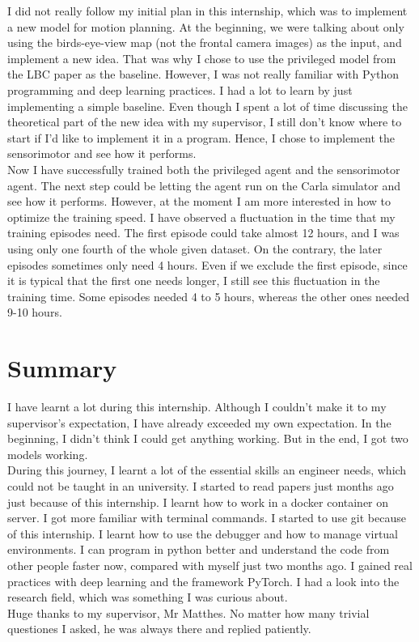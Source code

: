 \documentclass[inputenc=utf8]{ldvarticle}
\begin{document}
\noindent I did not really follow my initial plan in this internship, which was to implement a new model for motion planning. At the beginning, we were talking about only using the birds-eye-view map (not the frontal camera images) as the input, and implement a new idea. That was why I chose to use the privileged model from the LBC paper as the baseline. However, I was not really familiar with Python programming and deep learning practices. I had a lot to learn by just implementing a simple baseline. Even though I spent a lot of time discussing the theoretical part of the new idea with my supervisor, I still don’t know where to start if I’d like to implement it in a program. Hence, I chose to implement the sensorimotor and see how it performs.
\\

\noindent Now I have successfully trained both the privileged agent and the sensorimotor agent. The next step could be letting the agent run on the Carla simulator and see how it performs. However, at the moment I am more interested in how to optimize the training speed. I have observed a fluctuation in the time that my training episodes need. The first episode could take almost 12 hours, and I was using only one fourth of the whole given dataset. On the contrary, the later episodes sometimes only need 4 hours. Even if we exclude the first episode, since it is typical that the first one needs longer, I still see this fluctuation in the training time. Some episodes needed 4 to 5 hours, whereas the other ones needed 9-10 hours.

\section {Summary}
I have learnt a lot during this internship. Although I couldn’t make it to my supervisor’s expectation, I have already exceeded my own expectation. In the beginning, I didn’t think I could get anything working. But in the end, I got two models working.
\\

\noindent During this journey, I learnt a lot of the essential skills an engineer needs, which could not be taught in an university. I started to read papers just months ago just because of this internship. I learnt how to work in a docker container on server. I got more familiar with terminal commands. I started to use git because of this internship. I learnt how to use the debugger and how to manage virtual environments. I can program in python better and understand the code from other people faster now, compared with myself just two months ago. I gained real practices with deep learning and the framework PyTorch. I had a look into the research field, which was something I was curious about.
\\

\noindent Huge thanks to my supervisor, Mr Matthes. No matter how many trivial questiones I asked, he was always there and replied patiently.



\nocite{*}
\end{document}
